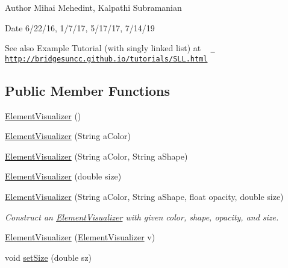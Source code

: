 \begin{DoxyAuthor}{Author}
Mihai Mehedint, Kalpathi Subramanian
\end{DoxyAuthor}
\begin{DoxyDate}{Date}
6/22/16, 1/7/17, 5/17/17, 7/14/19
\end{DoxyDate}
\begin{DoxySeeAlso}{See also}
Example Tutorial (with singly linked list) at ~\newline
 \href{http://bridgesuncc.github.io/tutorials/SLL.html}{\texttt{ http\+://bridgesuncc.\+github.\+io/tutorials/\+S\+L\+L.\+html}} 
\end{DoxySeeAlso}
\subsection*{Public Member Functions}
\begin{DoxyCompactItemize}
\item 
\mbox{\hyperlink{classbridges_1_1base_1_1_element_visualizer_acbca874876ec1e8dbbde6484a4fc056e}{Element\+Visualizer}} ()
\item 
\mbox{\hyperlink{classbridges_1_1base_1_1_element_visualizer_a5c0d9fe8051ebc816372b9836689fdfa}{Element\+Visualizer}} (String a\+Color)
\item 
\mbox{\hyperlink{classbridges_1_1base_1_1_element_visualizer_ab62b1b06907fbeddfcee2b4b297e1021}{Element\+Visualizer}} (String a\+Color, String a\+Shape)
\item 
\mbox{\hyperlink{classbridges_1_1base_1_1_element_visualizer_ab32f66b72ccf0a26c03ba44006da9ac6}{Element\+Visualizer}} (double size)
\item 
\mbox{\hyperlink{classbridges_1_1base_1_1_element_visualizer_a9bf06ca1b6c215e079ab33ccd99633e8}{Element\+Visualizer}} (String a\+Color, String a\+Shape, float opacity, double size)
\begin{DoxyCompactList}\small\item\em Construct an \mbox{\hyperlink{classbridges_1_1base_1_1_element_visualizer}{Element\+Visualizer}} with given color, shape, opacity, and size. \end{DoxyCompactList}\item 
\mbox{\hyperlink{classbridges_1_1base_1_1_element_visualizer_a5b48cbda94a4e84e40de41fe156e2497}{Element\+Visualizer}} (\mbox{\hyperlink{classbridges_1_1base_1_1_element_visualizer}{Element\+Visualizer}} v)
\item 
void \mbox{\hyperlink{classbridges_1_1base_1_1_element_visualizer_aba410184f7df495594fc1fa7948335a5}{set\+Size}} (double sz)

\end{DoxyCompactItemize}
